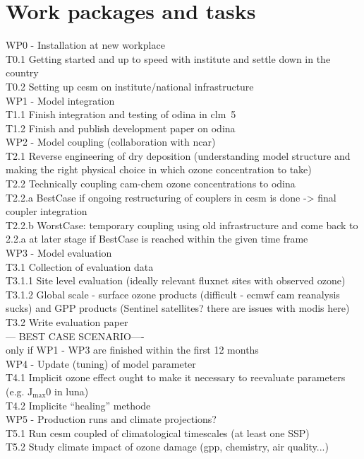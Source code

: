 \section*{Work packages and tasks}

WP0 - Installation at new workplace\\
T0.1 Getting started and up to speed with institute and settle down in the country\\
T0.2 Setting up \gls{cesm} on institute/national infrastructure\\
WP1 - Model integration\\
T1.1 Finish integration and testing of \gls{odina} in \gls{clm}~5\\
T1.2 Finish and publish development paper on \gls{odina}\\
WP2 - Model coupling (collaboration with \gls{ncar})\\
T2.1 Reverse engineering of dry deposition (understanding model structure and making the right physical choice in which ozone concentration to take)\\
T2.2 Technically coupling \gls{cam}-chem ozone concentrations to \gls{odina}\\
T2.2.a BestCase if ongoing restructuring of couplers in \gls{cesm} is done -> final coupler integration\\
T2.2.b WorstCase: temporary coupling using old infrastructure and come back to 2.2.a at later stage if BestCase is reached within the given time frame\\
WP3 - Model evaluation\\
T3.1 Collection of evaluation data \\
T3.1.1 Site level evaluation (ideally relevant fluxnet sites with observed ozone)\\
T3.1.2 Global scale - surface ozone products (difficult - \gls{ecmwf} \gls{cam} reanalysis sucks) and GPP products (Sentinel satellites? there are issues with \gls{modis} here)\\
T3.2 Write evaluation paper\\
--- BEST CASE SCENARIO----\\
only if WP1 - WP3 are finished within the first 12 months\\
WP4 - Update (tuning) of model parameter\\
T4.1 Implicit ozone effect ought to make it necessary to reevaluate parameters (e.g. $\mathrm{J_{max}}$0 in \gls{luna})\\
T4.2 Implicite “healing” methode\\
WP5 - Production runs and climate projections?\\
T5.1 Run \gls{cesm} coupled of climatological timescales (at least one SSP)\\
T5.2 Study climate impact of ozone damage (gpp, chemistry, air quality...)\\
\\

